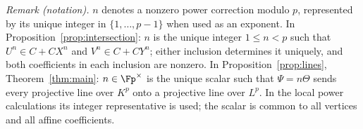 \noindent\textit{Remark (notation).} $n$ denotes a nonzero power correction modulo $p$, represented by its unique integer in $\{1,\ldots,p-1\}$ when used as an exponent. In Proposition~\ref{prop:intersection}: $n$ is the unique integer $1\le n<p$ such that $U^n\in C+CX^n$ and $V^n\in C+CY^n$; either inclusion determines it uniquely, and both coefficients in each inclusion are nonzero. In Proposition~\ref{prop:lines}, Theorem~\ref{thm:main}: $n\in\Fp^\times$ is the unique scalar such that $\Psi=n\Theta$ sends every projective line over $K^p$ onto a projective line over $L^p$. In the local power calculations its integer representative is used; the scalar is common to all vertices and all affine coefficients.

